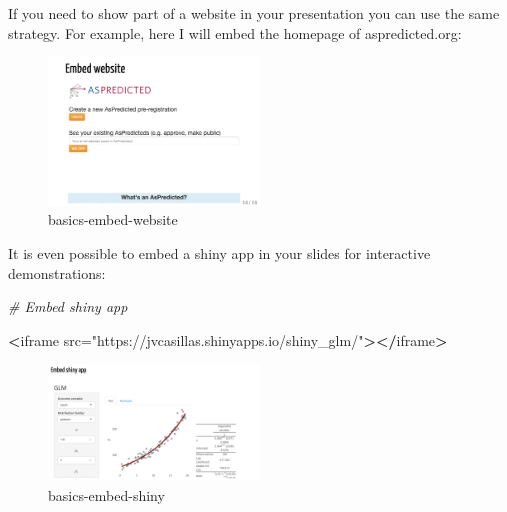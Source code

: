 \documentclass[
]{book}
\newenvironment{Shaded}{\begin{snugshade}}{\end{snugshade}}
\newcommand{\CommentTok}[1]{\textcolor[rgb]{0.37,0.37,0.37}{\textit{#1}}}
\newcommand{\ErrorTok}[1]{\textcolor[rgb]{0.14,0.14,0.14}{\textbf{#1}}}
\newcommand{\NormalTok}[1]{#1}
\newcommand{\OperatorTok}[1]{\textcolor[rgb]{0.43,0.43,0.43}{\textbf{#1}}}
\newcommand{\StringTok}[1]{\textcolor[rgb]{0.5,0.5,0.5}{#1}}
\begin{document}
If you need to show part of a website in your presentation you can use the same strategy. For example, here I will embed the homepage of aspredicted.org:

\begin{Shaded}
\end{Shaded}

\begin{figure}
\centering
\includegraphics[width=0.5\textwidth,height=\textheight]{img/02_basics-embed-website.png}
\caption{basics-embed-website}
\end{figure}

It is even possible to embed a shiny app in your slides for interactive demonstrations:

\begin{Shaded}
\begin{Highlighting}[]
\CommentTok{# Embed shiny app}

\OperatorTok{<}\NormalTok{iframe src=}\StringTok{"https://jvcasillas.shinyapps.io/shiny_glm/"}\OperatorTok{>}\ErrorTok{</}\NormalTok{iframe}\OperatorTok{>}
\end{Highlighting}
\end{Shaded}

\begin{figure}
\centering
\includegraphics[width=0.5\textwidth,height=\textheight]{img/02_basics-embed-shiny.png}
\caption{basics-embed-shiny}
\end{figure}
\end{document}
